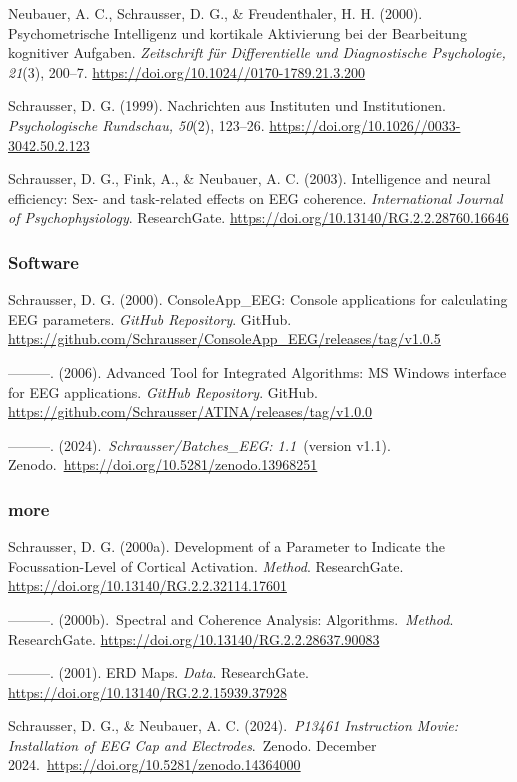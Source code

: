 \documentclass[
]{article}
\begin{document}
Neubauer, A. C., Schrausser, D. G., \& Freudenthaler, H. H. (2000).
Psychometrische Intelligenz und kortikale Aktivierung bei der
Bearbeitung kognitiver Aufgaben. \emph{Zeitschrift für Differentielle
und Diagnostische Psychologie, 21}(3), 200--7.
\url{https://doi.org/10.1024//0170-1789.21.3.200}

Schrausser, D. G. (1999). Nachrichten aus Instituten und Institutionen.
\emph{Psychologische Rundschau, 50}(2), 123--26.
\url{https://doi.org/10.1026//0033-3042.50.2.123}

Schrausser, D. G., Fink, A., \& Neubauer, A. C. (2003). Intelligence and
neural efficiency: Sex- and task-related effects on EEG coherence.
\emph{International Journal of Psychophysiology}. ResearchGate.
\url{https://doi.org/10.13140/RG.2.2.28760.16646}

\hypertarget{software-2}{%
\subsubsection{Software}\label{software-2}}

Schrausser, D. G. (2000). ConsoleApp\_EEG: Console applications for
calculating EEG parameters. \emph{GitHub Repository}. GitHub.
\url{https://github.com/Schrausser/ConsoleApp_EEG/releases/tag/v1.0.5}

---------. (2006). Advanced Tool for Integrated Algorithms: MS Windows
interface for EEG applications. \emph{GitHub Repository}. GitHub.
\url{https://github.com/Schrausser/ATINA/releases/tag/v1.0.0}

---------. (2024).~\emph{Schrausser/Batches\_EEG: 1.1}~(version v1.1).
Zenodo.~\url{https://doi.org/10.5281/zenodo.13968251}

\hypertarget{more-1}{%
\subsubsection{more}\label{more-1}}

Schrausser, D. G. (2000a). Development of a Parameter to Indicate the
Focussation-Level of Cortical Activation. \emph{Method}. ResearchGate.
\url{https://doi.org/10.13140/RG.2.2.32114.17601}

---------. (2000b).~Spectral and Coherence Analysis:
Algorithms.~\emph{Method}. ResearchGate.
\url{https://doi.org/10.13140/RG.2.2.28637.90083}

---------. (2001). ERD Maps. \emph{Data}. ResearchGate.
\url{https://doi.org/10.13140/RG.2.2.15939.37928}

Schrausser, D. G., \& Neubauer, A. C. (2024).~\emph{P13461 Instruction
Movie: Installation of EEG Cap and Electrodes}.~Zenodo. December
2024.~\url{https://doi.org/10.5281/zenodo.14364000}
\end{document}
